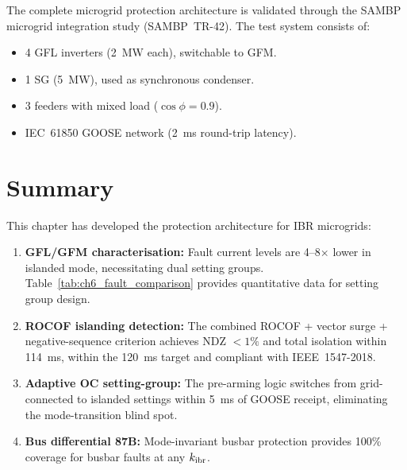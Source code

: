 The complete microgrid protection architecture is validated through the
SAMBP microgrid integration study (SAMBP~TR-42).
The test system consists of:
\begin{itemize}
\item 4 GFL inverters (2~MW each), switchable to GFM.
\item 1 SG (5~MW), used as synchronous condenser.
\item 3 feeders with mixed load ($\cos\phi = 0.9$).
\item IEC~61850 GOOSE network (2~ms round-trip latency).
\end{itemize}


\section{Summary}
\label{sec:ch5mg_summary}

This chapter has developed the protection architecture for IBR microgrids:
\begin{enumerate}
\item \textbf{GFL/GFM characterisation:} Fault current levels are
      4--8$\times$ lower in islanded mode, necessitating dual setting groups.
      Table~\ref{tab:ch6_fault_comparison} provides quantitative data for
      setting group design.
\item \textbf{ROCOF islanding detection:} The combined ROCOF +
      vector surge + negative-sequence criterion achieves NDZ $< 1\%$
      and total isolation within 114~ms, within the 120~ms target and
      compliant with IEEE~1547-2018.
\item \textbf{Adaptive OC setting-group:} The pre-arming logic
      switches from grid-connected to islanded settings within 5~ms of
      GOOSE receipt, eliminating the mode-transition blind spot.
\item \textbf{Bus differential 87B:} Mode-invariant busbar protection
      provides 100\% coverage for busbar faults at any $k_\mathrm{ibr}$.
\end{enumerate}
